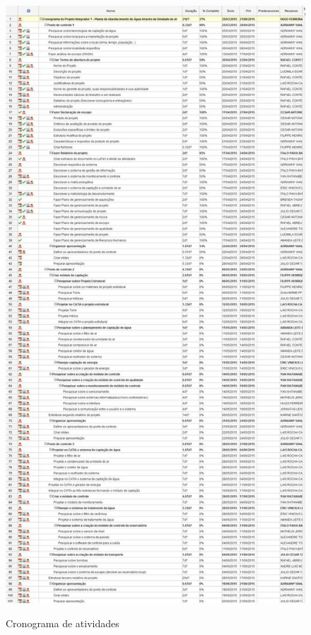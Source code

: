    \begin{figure}[!h]
    \centering
    \includegraphics[scale = 0.3]{editaveis/figuras/Cronograma}
    \label{Cronograma de atividades}
    \caption{Cronograma de atividades}
   \end{figure}
   \FloatBarrier
   
